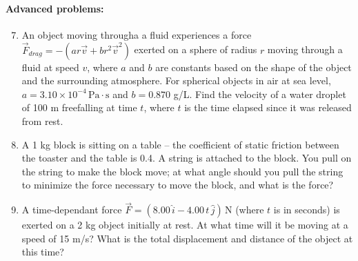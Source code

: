 \documentclass[12pt,letterpaper]{article}
\begin{document}
\paragraph{Advanced problems:}
\begin{enumerate}
\setcounter{enumi}{6}
\item
An object moving througha a fluid experiences a force $\vec{F}_{drag} = -(ar\vec{v} + br^2\vec{v}^2)$ exerted on a sphere of radius $r$ moving through a fluid at speed $v$, where $a$ and $b$ are constants based on the shape of the object and the surrounding atmosphere. For spherical objects in air at sea level, $a = 3.10 \times 10^{-4}\,\text{Pa}\cdot \text{s}$ and $b = 0.870$ g\slash L.
Find the velocity of a water droplet of 100 \textmu m freefalling at time $t$, where $t$ is the time elapsed since it was released from rest.

\item
A 1 kg block is sitting on a table -- the coefficient of static friction between the toaster and the table is 0.4. A string is attached to the block. You pull on the string to make the block move; at what angle should you pull the string to minimize the force necessary to move the block, and what is the force?

\item
A time-dependant force $\vec{F} = (8.00\,\hat{i} -4.00\,t\,\hat{j})\,\text{N}$ (where $t$ is in seconds) is exerted on a 2 kg object initially at rest. At what time will it be moving at a speed of 15 m\slash s? What is the total displacement and distance of the object at this time?
\end{enumerate}
\end{document}
